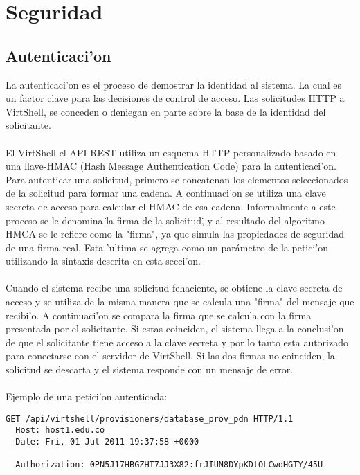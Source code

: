 \chapter{Seguridad}
\label{capseguridad}

\section{Autenticaci'on}
La autenticaci'on es el proceso de demostrar la identidad al sistema. La cual es un factor clave para las decisiones de control de acceso. Las solicitudes HTTP a VirtShell, se conceden o deniegan en parte sobre la base de la identidad del solicitante.\\
\\
El VirtShell el API REST utiliza un esquema HTTP personalizado basado en una llave-HMAC (Hash Message Authentication Code) para la autenticaci'on. Para autenticar una solicitud, primero se concatenan los elementos seleccionados de la solicitud para formar una cadena. A continuaci'on se utiliza una clave secreta de acceso para calcular el HMAC de esa cadena. Informalmente a este proceso se le denomina \"la firma de la solicitud\", y al resultado del algoritmo HMCA se le refiere como la "firma", ya que simula las propiedades de seguridad de una firma real. Esta 'ultima se agrega como un parámetro de la petici'on utilizando la sintaxis descrita en esta secci'on.\\
\\
Cuando el sistema recibe una solicitud fehaciente, se obtiene la clave secreta de acceso y se utiliza de la misma manera que se calcula una "firma" del mensaje que recibi'o. A continuaci'on se compara la firma que se calcula con la firma presentada por el solicitante. Si estas coinciden, el sistema llega a la conclusi'on de que el solicitante tiene acceso a la clave secreta y por lo tanto esta autorizado para conectarse con el servidor de VirtShell. Si las dos firmas no coinciden, la solicitud se descarta y el sistema responde con un mensaje de error.\\
\\
Ejemplo de una petici'on autenticada:

\medskip
\begin{lstlisting}[style=json, caption=Petición HTTP con firma]
  GET /api/virtshell/provisioners/database_prov_pdn HTTP/1.1
  Host: host1.edu.co
  Date: Fri, 01 Jul 2011 19:37:58 +0000

  Authorization: 0PN5J17HBGZHT7JJ3X82:frJIUN8DYpKDtOLCwoHGTY/45U
\end{lstlisting}

